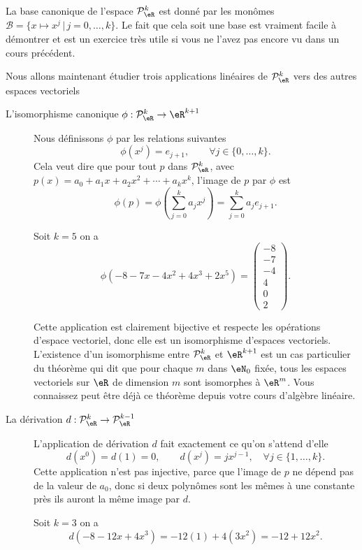 La base canonique de l'espace $\mathcal{P}_\eR^k$ est donné par les monômes $\mathcal{B}=\{x\mapsto x^j \,|\, j=0, \ldots, k\}$. Le fait que cela soit une base est vraiment facile à démontrer et est un exercice très utile si vous ne l'avez pas encore vu dans un cours précédent.

Nous allons maintenant étudier trois applications linéaires de $\mathcal{P}_\eR^k$ vers des autres espaces vectoriels
\begin{description}
  \item[L'isomorphisme canonique  $\phi:\mathcal{P}_\eR^k \to\eR^{k+1}$] Nous définissons $\phi$ par les relations suivantes
\[
\phi(x^j)=e_{j+1}, \qquad \forall j\in\{0,\dots, k\}.
\]
Cela veut dire que pour tout $p$ dans $\mathcal{P}_\eR^k$, avec $p(x)=a_0+a_1 x +a_2 x^2 + \cdots+a_k x^k$, l'image de $p$ par $\phi$ est
\[
\phi(p)=\phi\left(\sum_{j=0}^k a_j x^j\right)=\sum_{j=0}^k a_j e_{j+1}.
\]
\begin{example} Soit $k=5$ on a
  \begin{equation}
    \phi(-8-7x-4x^2+4x^3+2x^5)=
  \begin{pmatrix}
    -8\\
    -7\\
    -4\\
    4\\
    0\\
    2
  \end{pmatrix}.
  \end{equation}
\end{example}

Cette application est clairement bijective et respecte les opérations d'espace vectoriel, donc elle est un isomorphisme d'espaces vectoriels. L'existence d'un isomorphisme entre $\mathcal{P}_\eR^k$  et $\eR^{k+1}$ est un cas particulier du théorème qui dit que  pour chaque $m$ dans $\eN_0$ fixée, tous les espaces vectoriels sur $\eR$ de dimension $m$ sont isomorphes à $\eR^m$. Vous connaissez peut être déjà ce théorème depuis votre cours d'algèbre linéaire.
    \item[La dérivation $d: \mathcal{P}_\eR^k \to \mathcal{P}_\eR^{k-1}$] L'application de dérivation $d$ fait exactement ce qu'on s'attend d'elle
\[
d(x^0)=d(1)=0, \qquad d(x^j)=j x^{j-1}, \quad \forall j\in\{1,\dots, k\}.
\]
Cette application n'est pas injective, parce que l'image de $p$ ne dépend pas de la valeur de $a_0$, donc si deux polynômes sont les mêmes à une constante près ils auront la même image par $d$.

\begin{example} Soit $k=3$ on a
  \begin{equation}
    d(-8-12x+4x^3)= -12 (1) + 4 (3x^2) = -12+12 x^2.
    \end{equation}


\end{example}
\end{description}
